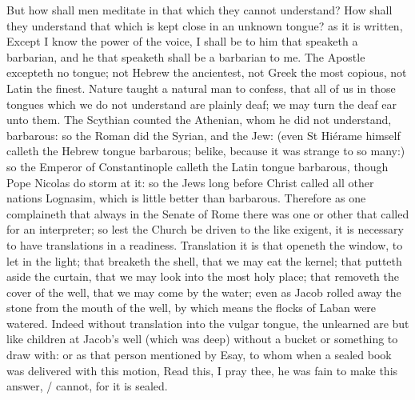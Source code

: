 But how shall men meditate in that which they cannot understand? How shall they understand that which is kept close in an unknown tongue? as it is written, Except I know the power of the voice, I shall be to him that speaketh a barbarian, and he that speaketh shall be a barbarian to me. The Apostle excepteth no tongue; not Hebrew the ancientest, not Greek the most copious, not Latin the finest. Nature taught a natural man to confess, that all of us in those tongues which we do not understand are plainly deaf; we may turn the deaf ear unto them. The Scythian counted the Athenian, whom he did not understand, barbarous: so the Roman did the Syrian, and the Jew: (even St Hiérame himself calleth the Hebrew tongue barbarous; belike, because it was strange to so many:) so the Emperor of Constantinople calleth the Latin tongue barbarous, though Pope Nicolas do storm at it: so the Jews long before Christ called all other nations Lognasim, which is little better than barbarous. Therefore as one complaineth that always in the Senate of Rome there was one or other that called for an interpreter; so lest the Church be driven to the like exigent, it is necessary to have translations in a readiness. Translation it is that openeth the window, to let in the light; that breaketh the shell, that we may eat the kernel; that putteth aside the curtain, that we may look into the most holy place; that removeth the cover of the well, that we may come by the water; even as Jacob rolled away the stone from the mouth of the well, by which means the flocks of Laban were watered. Indeed without translation into the vulgar tongue, the unlearned are but like children at Jacob's well (which was deep) without a bucket or something to draw with: or as that person mentioned by Esay, to whom when a sealed book was delivered with this motion, Read this, I pray thee, he was fain to make this answer, / cannot, for it is sealed.

